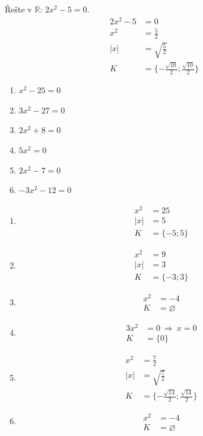 \documentclass[11pt,a4paper]{article}
\begin{document}
\begin{zadaniReseniBox}[title={Rozšíření 1}]
Řešte v $\mathbb R$: $2x^{2} - 5=0$.
\tcblower
\[
\begin{aligned}2x^2-5&=0\\x^2&=\frac52\\|x|&=\sqrt{\frac52}\\K&=\{-\frac{\sqrt{10}}2;\frac{\sqrt{10}}2\}\end{aligned}
\]
\end{zadaniReseniBox}

\begin{zadaniReseniBox}[title={Domácí úkol}]
\begin{enumerate}[label=\alph*),itemsep=2pt]
\item $x^{2} - 25=0$
\item $3x^{2} - 27=0$
\item $2x^{2} + 8=0$
\item $5x^{2}=0$
\item $2x^{2} - 7=0$
\item $- 3x^{2} - 12=0$
\end{enumerate}
\tcblower
\begin{enumerate}[label=\alph*),itemsep=2pt]
\item
\[\begin{aligned}
x^2&=25\\|x|&=5\\[2pt]
K&=\{-5;5\}
\end{aligned}\]
\item
\[\begin{aligned}
x^2&=9\\|x|&=3\\[2pt]
K&=\{-3;3\}
\end{aligned}\]
\item
\[\begin{aligned}
x^2&=-4\\[2pt]
K&=\varnothing
\end{aligned}\]
\item
\[\begin{aligned}
3x^2&=0\ \Rightarrow\ x=0\\[2pt]
K&=\{0\}
\end{aligned}\]
\item
\[\begin{aligned}
x^2&=\frac{7}{2}\\|x|&=\sqrt{\frac72}\\[2pt]
K&=\{- \frac{\sqrt{14}}{2};\frac{\sqrt{14}}{2}\}
\end{aligned}\]
\item
\[\begin{aligned}
x^2&=-4\\[2pt]
K&=\varnothing
\end{aligned}\]
\end{enumerate}
\end{zadaniReseniBox}
\end{document}
